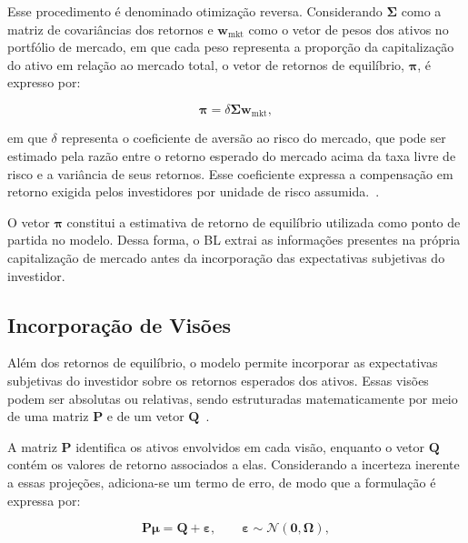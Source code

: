 Esse procedimento é denominado otimização reversa. Considerando $\boldsymbol{\Sigma}$ como a matriz de covariâncias dos retornos e $\mathbf{w}_{\mathrm{mkt}}$ como o vetor de pesos dos ativos no portfólio de mercado, em que cada peso representa a proporção da capitalização do ativo em relação ao mercado total, o vetor de retornos de equilíbrio, $\boldsymbol{\pi}$, é expresso por:

\begin{equation}
    \boldsymbol{\pi} = \delta\boldsymbol{\Sigma}\mathbf{w}_{\mathrm{mkt}},
    \label{eq:bl_prior}
\end{equation}

\noindent em que $\delta$ representa o coeficiente de aversão ao risco do mercado, que pode ser estimado pela razão entre o retorno esperado do mercado acima da taxa livre de risco e a variância de seus retornos. Esse coeficiente expressa a compensação em retorno exigida pelos investidores por unidade de risco assumida.~\cite{sharpe1964}.



O vetor $\boldsymbol{\pi}$ constitui a estimativa de retorno de equilíbrio utilizada como ponto de partida no modelo. Dessa forma, o BL extrai as informações presentes na própria capitalização de mercado antes da incorporação das expectativas subjetivas do investidor.

\subsection{Incorporação de Visões}
\label{subsec:bl_views}

Além dos retornos de equilíbrio, o modelo permite incorporar as expectativas subjetivas do investidor sobre os retornos esperados dos ativos. Essas visões podem ser absolutas ou relativas, sendo estruturadas matematicamente por meio de uma matriz $\mathbf{P}$ e de um vetor $\mathbf{Q}$~\cite{idzorek2005}.

A matriz $\mathbf{P}$ identifica os ativos envolvidos em cada visão, enquanto o vetor $\mathbf{Q}$ contém os valores de retorno associados a elas. Considerando a incerteza inerente a essas projeções, adiciona-se um termo de erro, de modo que a formulação é expressa por:

\begin{equation}
    \mathbf{P}\boldsymbol{\mu} = \mathbf{Q} + \boldsymbol{\varepsilon}, \qquad \boldsymbol{\varepsilon} \sim \mathcal{N}(\mathbf{0},\boldsymbol{\Omega}),
    \label{eq:bl_views}
\end{equation}

